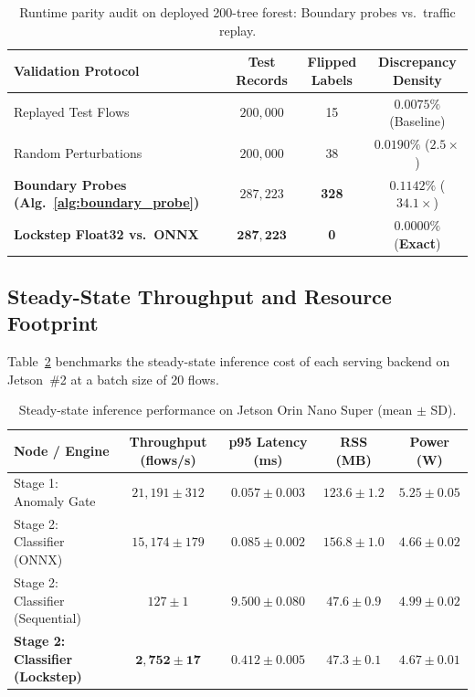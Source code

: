 \begin{table}[t]
  \caption{Runtime parity audit on deployed 200-tree forest: Boundary probes vs.\ traffic replay.}
  \label{tab:boundary}
  \centering
  \small
  \begin{tabular}{l c c c}
    \toprule
    Validation Protocol & Test Records & Flipped Labels & Discrepancy Density \\
    \midrule
    Replayed Test Flows & $200{,}000$ & 15 & $0.0075\%$ (Baseline) \\
    Random Perturbations & $200{,}000$ & 38 & $0.0190\%$ ($2.5\times$) \\
    \textbf{Boundary Probes (Alg.~\ref{alg:boundary_probe})} & $287{,}223$ & \textbf{328} & $\mathbf{0.1142\%}$ ($\mathbf{34.1\times}$) \\
    \midrule
    \textbf{Lockstep Float32 vs.\ ONNX} & $\mathbf{287{,}223}$ & \textbf{0} & $\mathbf{0.0000\%}$ (\textbf{Exact}) \\
    \bottomrule
  \end{tabular}
\end{table}

\subsection{Steady-State Throughput and Resource Footprint}

Table~\ref{tab:engines} benchmarks the steady-state inference cost of each serving backend on Jetson~\#2 at a batch size of 20 flows. 

\begin{table}[t]
  \caption{Steady-state inference performance on Jetson Orin Nano Super (mean $\pm$ SD).}
  \label{tab:engines}
  \centering
  \small
  \begin{tabular}{l c c c c}
    \toprule
    Node / Engine & Throughput (flows/s) & p95 Latency (ms) & RSS (MB) & Power (W) \\
    \midrule
    Stage 1: Anomaly Gate & $21{,}191 \pm 312$ & $0.057 \pm 0.003$ & $123.6 \pm 1.2$ & $5.25 \pm 0.05$ \\
    Stage 2: Classifier (ONNX) & $15{,}174 \pm 179$ & $0.085 \pm 0.002$ & $156.8 \pm 1.0$ & $4.66 \pm 0.02$ \\
    Stage 2: Classifier (Sequential) & $127 \pm 1$ & $9.500 \pm 0.080$ & $47.6 \pm 0.9$ & $4.99 \pm 0.02$ \\
    \textbf{Stage 2: Classifier (Lockstep)} & $\mathbf{2{,}752 \pm 17}$ & $\mathbf{0.412 \pm 0.005}$ & $\mathbf{47.3 \pm 0.1}$ & $\mathbf{4.67 \pm 0.01}$ \\
    \bottomrule
  \end{tabular}
\end{table}

